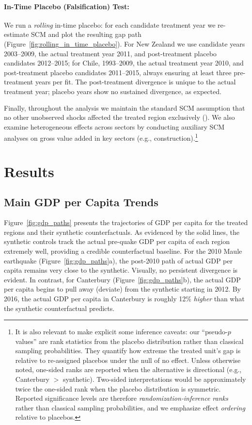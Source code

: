 \documentclass[12pt]{article}
\begin{document}
\paragraph{In-Time Placebo (Falsification) Test:} We run a \emph{rolling} in-time placebo: for each candidate treatment year we re-estimate SCM and plot the resulting gap path (Figure~\ref{fig:rolling_in_time_placebo}). For New Zealand we use candidate years 2003--2009, the actual treatment year 2011, and post-treatment placebo candidates 2012--2015; for Chile, 1993--2009, the actual treatment year 2010, and post-treatment placebo candidates 2011--2015, always ensuring at least three pre-treatment years per fit. The post-treatment divergence is unique to the actual treatment year; placebo years show no sustained divergence, as expected.


Finally, throughout the analysis we maintain the standard SCM assumption that no other unobserved shocks affected the treated region exclusively (\cite{abadie2010synthetic, abadie2003economic}). We also examine heterogeneous effects across sectors by conducting auxiliary SCM analyses on gross value added in key sectors (e.g., construction).\footnote{It is also relevant to make explicit some inference caveats: our “pseudo-$p$ values” are rank statistics from the placebo distribution rather than classical sampling probabilities. They quantify how extreme the treated unit’s gap is relative to re-assigned placebos under the null of no effect. Unless otherwise noted, one-sided ranks are reported when the alternative is directional (e.g., Canterbury $>$ synthetic). Two-sided interpretations would be approximately twice the one-sided rank when the placebo distribution is symmetric. Reported significance levels are therefore \emph{randomization‑inference ranks} rather than classical sampling probabilities, and we emphasize effect \emph{ordering} relative to placebos.}

\section{Results}
\subsection{Main GDP per Capita Trends}
\label{sec:main_gdp_results}
Figure \ref{fig:gdp_paths} presents the trajectories of GDP per capita for the treated regions and their synthetic counterfactuals. As evidenced by the solid lines, the synthetic controls track the actual pre-quake GDP per capita of each region extremely well, providing a credible counterfactual baseline. For the 2010 Maule earthquake (Figure \ref{fig:gdp_paths}a), the post-2010 path of actual GDP per capita remains very close to the synthetic. Visually, no persistent divergence is evident. In contrast, for Canterbury (Figure \ref{fig:gdp_paths}b), the actual GDP per capita begins to pull away (deviate) from the synthetic starting in 2012. By 2016, the actual GDP per capita in Canterbury is roughly 12\% \textit{higher} than what the synthetic counterfactual predicts.
\end{document}
